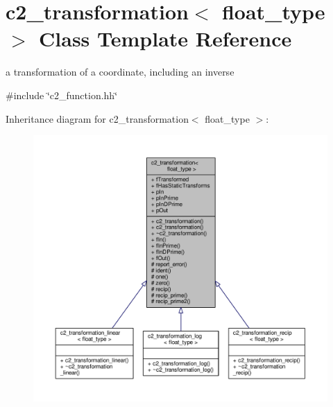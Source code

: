 \hypertarget{classc2__transformation}{}\section{c2\+\_\+transformation$<$ float\+\_\+type $>$ Class Template Reference}
\label{classc2__transformation}


a transformation of a coordinate, including an inverse  




{\ttfamily \#include \char`\"{}c2\+\_\+function.\+hh\char`\"{}}



Inheritance diagram for c2\+\_\+transformation$<$ float\+\_\+type $>$\+:
\nopagebreak
\begin{figure}[H]
\begin{center}
\leavevmode
\includegraphics[width=350pt]{classc2__transformation__inherit__graph}
\end{center}
\end{figure}


